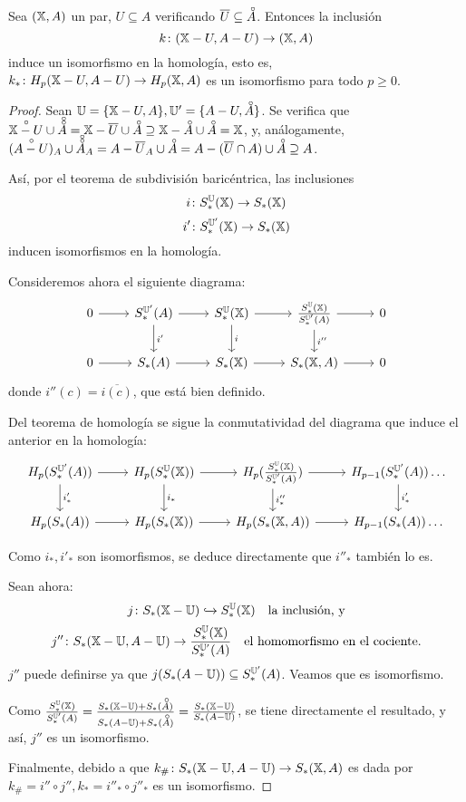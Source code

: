 \begin{theorem}
  Sea $({\mathbb X}, A)$ un par, $U \subseteq A$ verificando $\overline{U} \subseteq \interior{A}$. Entonces la inclusión
  \[ k \colon ({\mathbb X} - U, A - U) \to ({\mathbb X}, A) \]
  induce un isomorfismo en la homología, esto es, $k_* \colon H_p({\mathbb X} - U, A - U) \to H_p({\mathbb X}, A)$ es un isomorfismo para todo $p \geq 0$.
\end{theorem}

\begin{proof}
  Sean $\U = \{\X - U, A\}, \U' = \{A - U, \interior{A}\}$. Se verifica que $\interior{\X-U} \cup \interior{\interior{A}} = \X - \overline{U} \cup \interior{A}
  \supseteq \X - \interior{A} \cup \interior{A} = \X$, y, análogamente, $(\interior{A - U})_A \cup \interior{\interior{A}}_A = A - \overline{U}_A \cup \interior{A} =
  A - (\overline{U} \cap A) \cup \interior{A} \supseteq A$.

  Así, por el teorema de subdivisión baricéntrica, las inclusiones
  \[i \colon S_*^{\mathbb U}({\mathbb X}) \to S_*({\mathbb X}) \]
  \[i' \colon S_*^{{\mathbb U}'}({\mathbb X}) \to S_*({\mathbb X}) \]
  inducen isomorfismos en la homología.

  Consideremos ahora el siguiente diagrama:
  \[ \begin{tikzcd}
  0 \arrow{r} & S_*^{\U'}(A) \arrow{r} \arrow{d}{i'} & S_*^{\U}(\X) \arrow{r} \arrow{d}{i} & \frac{S_*^{\U}(\X)}{S_*^{\U'}(A)} \arrow{r} \arrow{d}{i''} & 0 \\
  0 \arrow{r} & S_*(A) \arrow{r} & S_*(\X) \arrow{r} & S_*(\X, A) \arrow{r} & 0
  \end{tikzcd} \]
  donde $i''(c) = \overline{i(c)}$, que está bien definido.

  Del teorema de homología se sigue la conmutatividad del diagrama que induce el anterior en la homología:
  \[ \begin{tikzcd}
  H_p(S_*^{\U'}(A)) \arrow{r} \arrow{d}{i'_*} & H_p(S_*^{\U}(\X)) \arrow{r} \arrow{d}{i_*} & H_p(\frac{S_*^{\U}(\X)}{S_*^{\U'}(A)}) \arrow{r} \arrow{d}{i''_*} & H_{p-1}(S_*^{\U'}(A)) \arrow{d}{i'_*} \dots \\
  H_p(S_*(A)) \arrow{r} & H_p(S_*(\X)) \arrow{r} & H_p(S_*(\X, A)) \arrow{r} & H_{p-1}(S_*(A)) \dots
  \end{tikzcd} \]

  Como $i_*, i'_*$ son isomorfismos, se deduce directamente que $i''_*$ también lo es.

  Sean ahora:
  \[j \colon S_*({\mathbb X} - {\mathbb U}) \xhookrightarrow{}   S_*^{\mathbb U}({\mathbb X}) \quad \text{la inclusión, y} \]
  \[j'' \colon S_*({\mathbb X} - {\mathbb U}, A - {\mathbb U}) \to \frac{S_*^{{\mathbb U}}({\mathbb X})}{S_*^{{\mathbb U}'}(A)} \quad \text{el homomorfismo en el cociente.}\]
  $j''$ puede definirse ya que $j(S_*(A - {\mathbb U})) \subseteq S_*^{{\mathbb U}'}(A)$. Veamos que es isomorfismo.

  Como $\frac{S_*^{\U}(\X)}{S_*^{\U'}(A)} = \frac{S_*(\X - \U) + S_*(\interior{A})}{S_*(A - \U) + S_*(\interior{A})} = \frac{S_*(\X-\U)}{S_*(A-\U)}$, se tiene
  directamente el resultado, y así, $j''$ es un isomorfismo.

  Finalmente, debido a que $k_\# \colon S_*({\mathbb X}-{\mathbb U}, A-{\mathbb U}) \to S_*({\mathbb X}, A)$ es dada por \\
  $k_\# = i'' \circ j'', k_* = i''_* \circ j''_*$ es un isomorfismo.
\end{proof}

